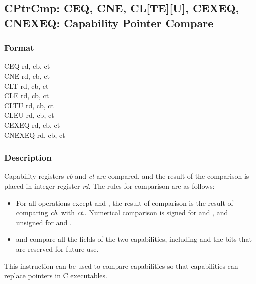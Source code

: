 \clearpage
{}
{}
\subsection*{CPtrCmp: CEQ, CNE, CL[TE][U], CEXEQ, CNEXEQ: Capability Pointer Compare}

\subsubsection*{Format}

CEQ rd, cb, ct \\
CNE rd, cb, ct \\
CLT rd, cb, ct \\
CLE rd, cb, ct \\
CLTU rd, cb, ct \\
CLEU rd, cb, ct \\
CEXEQ rd, cb, ct \\
CNEXEQ rd, cb, ct \\

\subsubsection*{Description}

Capability registers \emph{cb} and \emph{ct} are compared, and the result
of the comparison is placed in integer register \emph{rd}.
The rules for comparison are as follows:

\begin{itemize}
\item For all operations except  and ,
the result of comparison is the result of comparing \emph{cb}.\caddr{} with \emph{ct}.\caddr{}.
Numerical comparison is signed for  and ,
and unsigned for  and .
\item
{} and  compare all the fields of the two
capabilities, including \ctag{} and the bits that are reserved for future use.
\end{itemize}

This instruction can be used to compare capabilities so that capabilities can
replace pointers in C executables.


